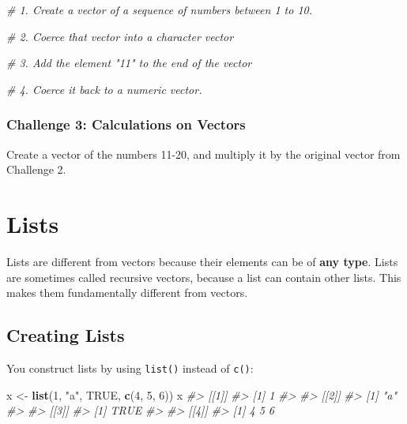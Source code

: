 \documentclass[]{book}
\newenvironment{Shaded}{\begin{snugshade}}{\end{snugshade}}
\newcommand{\KeywordTok}[1]{\textcolor[rgb]{0.13,0.29,0.53}{\textbf{#1}}}
\newcommand{\DecValTok}[1]{\textcolor[rgb]{0.00,0.00,0.81}{#1}}
\newcommand{\StringTok}[1]{\textcolor[rgb]{0.31,0.60,0.02}{#1}}
\newcommand{\CommentTok}[1]{\textcolor[rgb]{0.56,0.35,0.01}{\textit{#1}}}
\newcommand{\OtherTok}[1]{\textcolor[rgb]{0.56,0.35,0.01}{#1}}
\newcommand{\NormalTok}[1]{#1}
\begin{document}
\begin{Shaded}
\begin{Highlighting}[]

\CommentTok{# 1. Create a vector of a sequence of numbers between 1 to 10.}

\CommentTok{# 2. Coerce that vector into a character vector}

\CommentTok{# 3. Add the element "11" to the end of the vector}

\CommentTok{# 4. Coerce it back to a numeric vector.}
\end{Highlighting}
\end{Shaded}

\subsubsection*{Challenge 3: Calculations on
Vectors}\label{challenge-3-calculations-on-vectors}

Create a vector of the numbers 11-20, and multiply it by the original
vector from Challenge 2.

\hypertarget{lists}{\section{Lists}\label{lists}}

Lists are different from vectors because their elements can be of
\textbf{any type}. Lists are sometimes called recursive vectors, because
a list can contain other lists. This makes them fundamentally different
from vectors.

\subsection{Creating Lists}\label{creating-lists}

You construct lists by using \texttt{list()} instead of \texttt{c()}:

\begin{Shaded}
\begin{Highlighting}[]
\NormalTok{x <-}\StringTok{ }\KeywordTok{list}\NormalTok{(}\DecValTok{1}\NormalTok{, }\StringTok{"a"}\NormalTok{, }\OtherTok{TRUE}\NormalTok{, }\KeywordTok{c}\NormalTok{(}\DecValTok{4}\NormalTok{, }\DecValTok{5}\NormalTok{, }\DecValTok{6}\NormalTok{))}
\NormalTok{x}
\CommentTok{#> [[1]]}
\CommentTok{#> [1] 1}
\CommentTok{#> }
\CommentTok{#> [[2]]}
\CommentTok{#> [1] "a"}
\CommentTok{#> }
\CommentTok{#> [[3]]}
\CommentTok{#> [1] TRUE}
\CommentTok{#> }
\CommentTok{#> [[4]]}
\CommentTok{#> [1] 4 5 6}
\end{Highlighting}
\end{Shaded}
\end{document}
